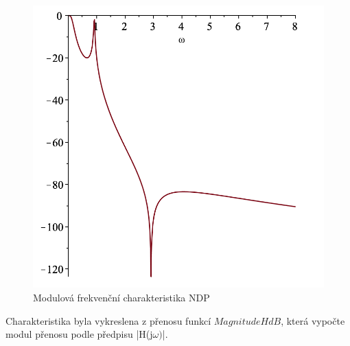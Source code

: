 \documentclass[twoside]{article}
\begin{document}
\begin{figure}[H]
\centering
\includegraphics[scale=0.6]{sch.png}
\caption{Modulová frekvenční charakteristika NDP}
\end{figure}
\noindent Charakteristika byla vykreslena z přenosu funkcí $MagnitudeHdB$, která vypočte modul přenosu podle předpisu |H(j$\omega)$|.
\newpage
\end{document}
